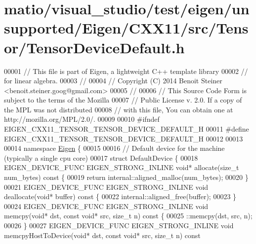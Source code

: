\hypertarget{matio_2visual__studio_2test_2eigen_2unsupported_2_eigen_2_c_x_x11_2src_2_tensor_2_tensor_device_default_8h_source}{}\section{matio/visual\+\_\+studio/test/eigen/unsupported/\+Eigen/\+C\+X\+X11/src/\+Tensor/\+Tensor\+Device\+Default.h}
\label{matio_2visual__studio_2test_2eigen_2unsupported_2_eigen_2_c_x_x11_2src_2_tensor_2_tensor_device_default_8h_source}

\begin{DoxyCode}
00001 \textcolor{comment}{// This file is part of Eigen, a lightweight C++ template library}
00002 \textcolor{comment}{// for linear algebra.}
00003 \textcolor{comment}{//}
00004 \textcolor{comment}{// Copyright (C) 2014 Benoit Steiner <benoit.steiner.goog@gmail.com>}
00005 \textcolor{comment}{//}
00006 \textcolor{comment}{// This Source Code Form is subject to the terms of the Mozilla}
00007 \textcolor{comment}{// Public License v. 2.0. If a copy of the MPL was not distributed}
00008 \textcolor{comment}{// with this file, You can obtain one at http://mozilla.org/MPL/2.0/.}
00009 
00010 \textcolor{preprocessor}{#ifndef EIGEN\_CXX11\_TENSOR\_TENSOR\_DEVICE\_DEFAULT\_H}
00011 \textcolor{preprocessor}{#define EIGEN\_CXX11\_TENSOR\_TENSOR\_DEVICE\_DEFAULT\_H}
00012 
00013 
00014 \textcolor{keyword}{namespace }\hyperlink{namespace_eigen}{Eigen} \{
00015 
00016 \textcolor{comment}{// Default device for the machine (typically a single cpu core)}
00017 \textcolor{keyword}{struct }DefaultDevice \{
00018   EIGEN\_DEVICE\_FUNC EIGEN\_STRONG\_INLINE \textcolor{keywordtype}{void}* allocate(\textcolor{keywordtype}{size\_t} num\_bytes)\textcolor{keyword}{ const }\{
00019     \textcolor{keywordflow}{return} internal::aligned\_malloc(num\_bytes);
00020   \}
00021   EIGEN\_DEVICE\_FUNC EIGEN\_STRONG\_INLINE \textcolor{keywordtype}{void} deallocate(\textcolor{keywordtype}{void}* buffer)\textcolor{keyword}{ const }\{
00022     internal::aligned\_free(buffer);
00023   \}
00024   EIGEN\_DEVICE\_FUNC EIGEN\_STRONG\_INLINE \textcolor{keywordtype}{void} memcpy(\textcolor{keywordtype}{void}* dst, \textcolor{keyword}{const} \textcolor{keywordtype}{void}* src, \textcolor{keywordtype}{size\_t} n)\textcolor{keyword}{ const }\{
00025     ::memcpy(dst, src, n);
00026   \}
00027   EIGEN\_DEVICE\_FUNC EIGEN\_STRONG\_INLINE \textcolor{keywordtype}{void} memcpyHostToDevice(\textcolor{keywordtype}{void}* dst, \textcolor{keyword}{const} \textcolor{keywordtype}{void}* src, \textcolor{keywordtype}{size\_t} n)\textcolor{keyword}{ const
}
\end{DoxyCode}
